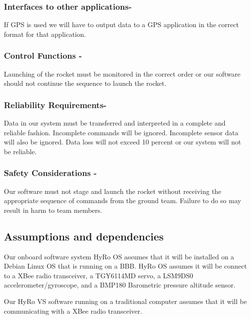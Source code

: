 \documentclass[10pt,draftclsnofoot,onecolumn,compsoc]{IEEEtran}
\begin{document}
\subsubsection{\bf  Interfaces to other applications-} If GPS is used we will have to output data to a GPS application in the correct format for that application.
\subsubsection{\bf Control Functions -} Launching of the rocket must be monitored in the correct order or our software should not continue the sequence to launch the rocket.
\subsubsection{\bf Reliability Requirements-} Data in our system must be transferred and interpreted in a complete and reliable fashion. Incomplete commands will be ignored. Incomplete sensor data will also be ignored. Data loss will not exceed 10 percent or our system will not be reliable.
\subsubsection{\bf Safety Considerations -} Our software must not stage and launch the rocket without receiving the appropriate sequence of commands from the ground team. Failure to do so may result in harm to team members.

\subsection{\bf Assumptions and dependencies}
Our onboard software system HyRo OS assumes that it will be installed on a Debian Linux OS that is running on a BBB.  HyRo OS assumes it will be connect to a XBee radio transceiver, a TGY6114MD servo, a LSM9DS0 accelerometer/gyroscope, and a BMP180 Barometric pressure altitude sensor.\par
	Our HyRo VS software running on a traditional computer assumes that it will be communicating with a XBee radio transceiver.
\end{document}
